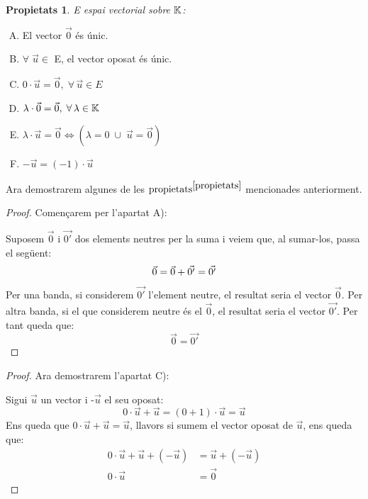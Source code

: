 \documentclass[a4paper, 11pt]{article}
\newtheorem*{propietats}{Propietats}
\begin{document}
\begin{propietats}\label{propietats}
	E espai vectorial sobre $\mathbb{K}$:
\end{propietats}
\begin{enumerate}[A)]
	\item El vector $\vec{0}$ és únic.
	\item $\forall \; \vec{u} \in$ E, el vector oposat és únic.
	\item $0 \cdot \vec{u} = \vec{0}, \; \forall \, \vec{u} \in E$
	\item $\lambda \cdot \vec{0} = \vec{0}, \; \forall \, \lambda \in \mathbb{K}$
	\item $\lambda \cdot \vec{u} = \vec{0} \iff (\lambda = 0 \; \cup \; \vec{u} = \vec{0})$
	\item$-\vec{u} = (-1) \cdot \vec{u}$
\end{enumerate}
Ara demostrarem algunes de les $\text{propietats}^{\ref{propietats}}$ mencionades anteriorment.
\begin{proof}
	Començarem per l'apartat A):
	
	Suposem $\vec{0}$ i $\vec{0'}$ dos elements neutres per la suma i veiem que, al sumar-los, passa el següent:
	\begin{equation*}
		\vec{0}=\vec{0}+\vec{0'}=\vec{0'} \\
	\end{equation*}
	Per una banda, si considerem $\vec{0'}$ l'element neutre, el resultat seria el vector $\vec{0}$. Per altra banda, si el que considerem neutre és el $\vec{0}$, el resultat seria el vector $\vec{0'}$. Per tant queda que:
	\begin{equation*}
		\vec{0}=\vec{0'}
	\end{equation*}
\end{proof}
\begin{proof}
	Ara demostrarem l'apartat C):
	
	Sigui $\vec{u}$ un vector i -$\vec{u}$ el seu oposat:
	\begin{equation*}
		0 \cdot \vec{u} + \vec{u} = (0+1) \cdot \vec{u} = \vec{u}
	\end{equation*}
	Ens queda que $0\cdot\vec{u}+\vec{u}=\vec{u}$, llavors si sumem el vector oposat de $\vec{u}$, ens queda que:
	\begin{align*}
		0\cdot\vec{u} + \vec{u} + (-\vec{u}) &= \vec{u} + (-\vec{u}) \\
		0\cdot\vec{u}&=\vec{0}
	\end{align*}
\end{proof}
\end{document}
